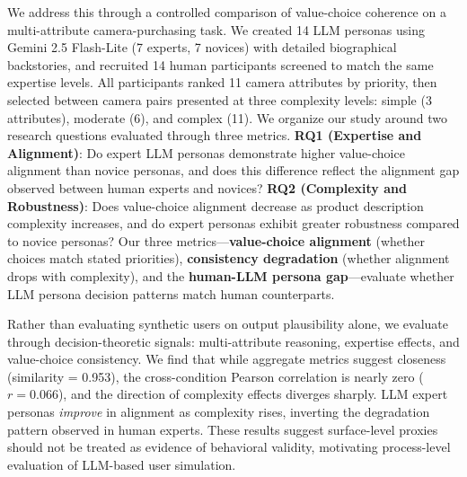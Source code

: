 \documentclass[manuscript,review]{acmart}
\begin{document}
We address this through a controlled comparison of value-choice coherence on a multi-attribute camera-purchasing task. We created 14 LLM personas using Gemini 2.5 Flash-Lite (7 experts, 7 novices) with detailed biographical backstories, and recruited 14 human participants screened to match the same expertise levels. All participants ranked 11 camera attributes by priority, then selected between camera pairs presented at three complexity levels: simple (3 attributes), moderate (6), and complex (11). We organize our study around two research questions evaluated through three metrics. \textbf{RQ1 (Expertise and Alignment)}: Do expert LLM personas demonstrate higher value-choice alignment than novice personas, and does this difference reflect the alignment gap observed between human experts and novices? \textbf{RQ2 (Complexity and Robustness)}: Does value-choice alignment decrease as product description complexity increases, and do expert personas exhibit greater robustness compared to novice personas? Our three metrics---\textbf{value-choice alignment} (whether choices match stated priorities), \textbf{consistency degradation} (whether alignment drops with complexity), and the \textbf{human-LLM persona gap}---evaluate whether LLM persona decision patterns match human counterparts.

Rather than evaluating synthetic users on output plausibility alone, we evaluate through decision-theoretic signals: multi-attribute reasoning, expertise effects, and value-choice consistency. We find that while aggregate metrics suggest closeness (similarity = 0.953), the cross-condition Pearson correlation is nearly zero ($r = 0.066$), and the direction of complexity effects diverges sharply. LLM expert personas \emph{improve} in alignment as complexity rises, inverting the degradation pattern observed in human experts. These results suggest surface-level proxies should not be treated as evidence of behavioral validity, motivating process-level evaluation of LLM-based user simulation.
\end{document}
